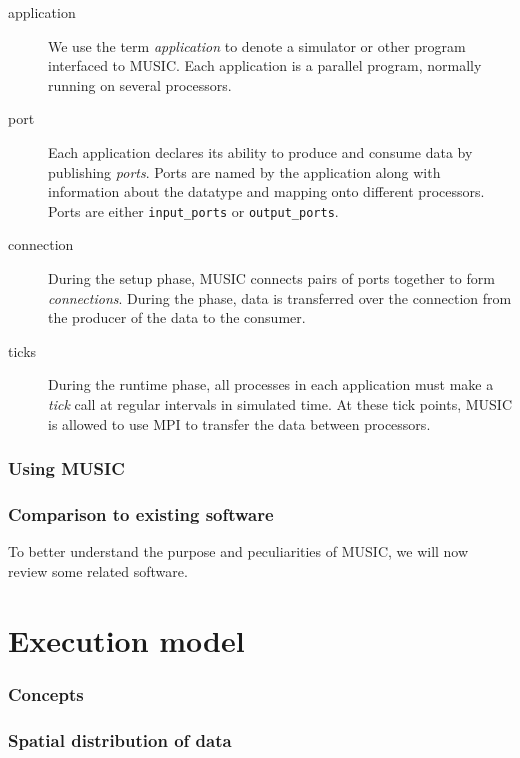 \documentclass[a4paper]{report}
\begin{document}
\begin{description}
\item[application] We use the term \emph{application} to denote a
  simulator or other program interfaced to MUSIC.  Each application is
  a parallel program, normally running on several processors.

\item[port] Each application declares its ability to
  produce and consume data by publishing \emph{ports}.  Ports are
  named by the application along with information about the datatype
  and mapping onto different processors.  Ports are either
\verb|input_ports| or \verb|output_ports|.

\item[connection] During the setup phase, MUSIC connects pairs of ports
  together to form \emph{connections}.  During the phase, data is
  transferred over the connection from the producer of the data to the
  consumer.

\item[ticks] During the runtime phase, all processes in each
  application must make a \emph{tick} call at regular intervals in
  simulated time.  At these tick points, MUSIC is allowed to use MPI
  to transfer the data between processors.
\end{description}


\subsection{Using MUSIC}


\subsection{Comparison to existing software}

To better understand the purpose and peculiarities of MUSIC, we will
now review some related software.


\chapter{Execution model}

\subsection{Concepts}

\subsection{Spatial distribution of data}
\end{document}
